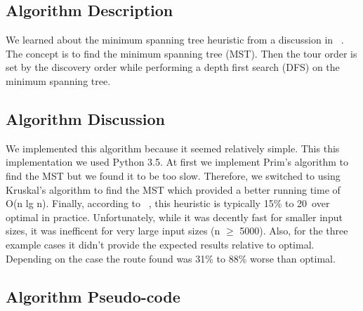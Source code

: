\documentclass[../report/main.tex]{subfiles}
\begin{document}
\subsection*{Algorithm Description}

We learned about the minimum spanning tree heuristic from a discussion in ~\cite{skiena/2008}.  The concept is to find the minimum spanning tree (MST).  Then the tour order is set by the discovery order while performing a depth first search (DFS) on the minimum spanning tree.

\subsection*{Algorithm Discussion}

We implemented this algorithm because it seemed relatively simple.  This this implementation we used Python 3.5.  At first we implement Prim's algorithm to find the MST but we found it to be too slow.  Therefore, we switched to using Kruskal's algorithm to find the MST which provided a better running time of O(n lg n).  Finally, according to ~\cite{skiena/2008}, this heuristic is typically 15\% to 20\ over optimal in practice.  Unfortunately, while it was decently fast for smaller input sizes, it was inefficent for very large input sizes (n $\geq$ 5000).  Also, for the three example cases it didn't provide the expected results relative to optimal.  Depending on the case the route found was 31\% to 88\% worse than optimal. 

\subsection*{Algorithm Pseudo-code}
\end{document}
